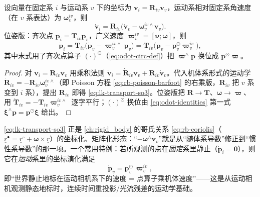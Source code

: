 \begin{theorem}[输运定理]\label{thm:lie-transport}
设向量在固定系 $i$ 与运动系 $v$ 下的坐标为 $\mathbf{v}_i=\mathbf{R}_{iv}\mathbf{v}_v$，运动系相对固定系角速度（在 $v$ 系表达）为 $\boldsymbol{\omega}_v^{iv}$，则
\begin{equation}
  \dot{\mathbf{v}}_i=\mathbf{R}_{iv}\big(\dot{\mathbf{v}}_v-\boldsymbol{\omega}_v^{iv\wedge}\mathbf{v}_v\big).
  \label{eq:lk-transport-so3}
\end{equation}
位姿版：齐次点 $\mathbf{p}_i=\mathbf{T}_{iv}\mathbf{p}_v$，广义速度 $\boldsymbol{\varpi}_v^{iv}=[\boldsymbol{\nu};\boldsymbol{\omega}]$，则
\begin{equation}
  \dot{\mathbf{p}}_i=\mathbf{T}_{iv}\big(\dot{\mathbf{p}}_v-\boldsymbol{\varpi}_v^{iv\wedge}\mathbf{p}_v\big)
  =\mathbf{T}_{iv}\big(\dot{\mathbf{p}}_v-\mathbf{p}_v^{\odot}\boldsymbol{\varpi}_v^{iv}\big),
  \label{eq:lk-transport-se3}
\end{equation}
其中末式用了齐次点算子 $(\cdot)^\odot$（\cref{eq:odot-circ-def}）把 $\boldsymbol{\varpi}^\wedge\mathbf{p}$ 换位成 $\mathbf{p}^\odot\boldsymbol{\varpi}$。
\end{theorem}
\begin{proof}
对 $\mathbf{v}_i=\mathbf{R}_{iv}\mathbf{v}_v$ 用乘积法则 $\dot{\mathbf{v}}_i=\dot{\mathbf{R}}_{iv}\mathbf{v}_v+\mathbf{R}_{iv}\dot{\mathbf{v}}_v$。代入机体系形式的运动学 $\dot{\mathbf{R}}_{iv}=-\mathbf{R}_{iv}\boldsymbol{\omega}_v^{iv\wedge}$（即 Poisson 方程 \cref{eq:rb-poisson-barfoot} 的右乘版，$\mathbf{R}_{iv}$ 把 $v$ 系变到 $i$ 系），提出 $\mathbf{R}_{iv}$ 即得 \cref{eq:lk-transport-so3}。位姿版把 $\mathbf{R}\to\mathbf{T}$、$\boldsymbol{\omega}\to\boldsymbol{\varpi}$、用 $\dot{\mathbf{T}}_{iv}=-\mathbf{T}_{iv}\boldsymbol{\varpi}_v^{iv\wedge}$ 逐字平行；$(\cdot)^\odot$ 换位由 \cref{eq:odot-identities} 第一式 $\boldsymbol{\xi}^\wedge\mathbf{p}=\mathbf{p}^\odot\boldsymbol{\xi}$ 给出。
\end{proof}

\noindent\cref{eq:lk-transport-so3} 正是 \cref{ch:rigid_body} 的哥氏关系 \cref{eq:rb-coriolis}（$\underline{r}^{\bullet}=\underline{r}^{\circ}+\boldsymbol{\omega}\times\underline{r}$）的坐标化、矩阵化形态：“$-\boldsymbol{\omega}^\wedge\mathbf{v}_v$”就是从“随体系导数”修正到“惯性系导数”的那一项。一个常用特例：若所观测的点在\emph{固定}系里静止（$\dot{\mathbf{p}}_i=\mathbf{0}$），则它在\emph{运动}系里的坐标演化满足
\begin{equation}
  \dot{\mathbf{p}}_v=\mathbf{p}_v^{\odot}\,\boldsymbol{\varpi}_v^{iv},
  \label{eq:lk-transport-static}
\end{equation}
即“世界静止地标在运动相机系下的速度 = 点算子乘机体速度”——这是从运动相机观测静态地标时，连续时间重投影/光流残差的运动学基础。

